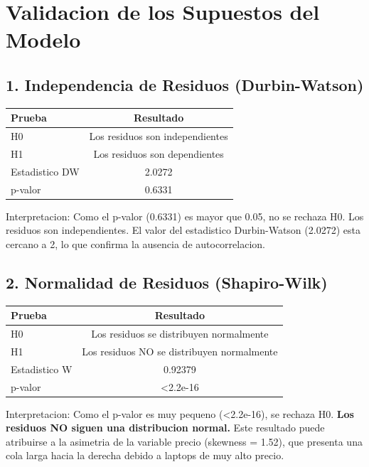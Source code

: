 \documentclass[12pt,a4paper]{article}
\begin{document}
\section{Validacion de los Supuestos del Modelo}

\subsection{1. Independencia de Residuos (Durbin-Watson)}

\begin{table}[H]
\centering
\begin{tabular}{lc}
\toprule
\textbf{Prueba} & \textbf{Resultado} \\
\midrule
H0 & Los residuos son independientes \\
H1 & Los residuos son dependientes \\
Estadistico DW & 2.0272 \\
p-valor & 0.6331 \\
\bottomrule
\end{tabular}
\end{table}

Interpretacion: Como el p-valor (0.6331) es mayor que 0.05, no se rechaza H0. Los residuos son independientes. El valor del estadistico Durbin-Watson (2.0272) esta cercano a 2, lo que confirma la ausencia de autocorrelacion.

\subsection{2. Normalidad de Residuos (Shapiro-Wilk)}

\begin{table}[H]
\centering
\begin{tabular}{lc}
\toprule
\textbf{Prueba} & \textbf{Resultado} \\
\midrule
H0 & Los residuos se distribuyen normalmente \\
H1 & Los residuos NO se distribuyen normalmente \\
Estadistico W & 0.92379 \\
p-valor & \textless{}2.2e-16 \\
\bottomrule
\end{tabular}
\end{table}

Interpretacion: Como el p-valor es muy pequeno (\textless{}2.2e-16), se rechaza H0. \textbf{Los residuos NO siguen una distribucion normal.} Este resultado puede atribuirse a la asimetria de la variable precio (skewness = 1.52), que presenta una cola larga hacia la derecha debido a laptops de muy alto precio.
\end{document}
